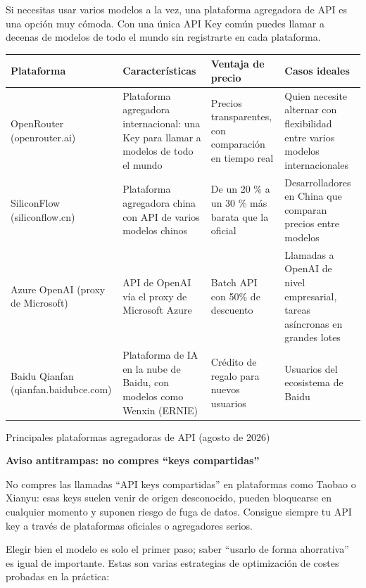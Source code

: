 
Si necesitas usar varios modelos a la vez, una plataforma agregadora de API es una opción muy cómoda. Con una única API Key común puedes llamar a decenas de modelos de todo el mundo sin registrarte en cada plataforma.

\begin{center}
\begin{tabularx}{\linewidth}{|X|X|X|X|}
\hline
\textbf{Plataforma} & \textbf{Características} & \textbf{Ventaja de precio} & \textbf{Casos ideales} \tabularnewline
\hline
OpenRouter (openrouter.ai) & Plataforma agregadora internacional: una Key para llamar a modelos de todo el mundo & Precios transparentes, con comparación en tiempo real & Quien necesite alternar con flexibilidad entre varios modelos internacionales \tabularnewline
SiliconFlow (siliconflow.cn) & Plataforma agregadora china con API de varios modelos chinos & De un 20 \% a un 30 \% más barata que la oficial & Desarrolladores en China que comparan precios entre modelos \tabularnewline
Azure OpenAI (proxy de Microsoft) & API de OpenAI vía el proxy de Microsoft Azure & Batch API con 50\% de descuento & Llamadas a OpenAI de nivel empresarial, tareas asíncronas en grandes lotes \tabularnewline
Baidu Qianfan (qianfan.baidubce.com) & Plataforma de IA en la nube de Baidu, con modelos como Wenxin (ERNIE) & Crédito de regalo para nuevos usuarios & Usuarios del ecosistema de Baidu \tabularnewline
\hline
\end{tabularx}
\end{center}

\begin{center}\small\color{gray}Principales plataformas agregadoras de API (agosto de 2026)\end{center}

\textbf{Aviso antitrampas: no compres “keys compartidas”}\par

No compres las llamadas “API keys compartidas” en plataformas como Taobao o Xianyu: esas keys suelen venir de origen desconocido, pueden bloquearse en cualquier momento y suponen riesgo de fuga de datos. Consigue siempre tu API key a través de plataformas oficiales o agregadores serios.


Elegir bien el modelo es solo el primer paso; saber “usarlo de forma ahorrativa” es igual de importante. Estas son varias estrategias de optimización de costes probadas en la práctica:


